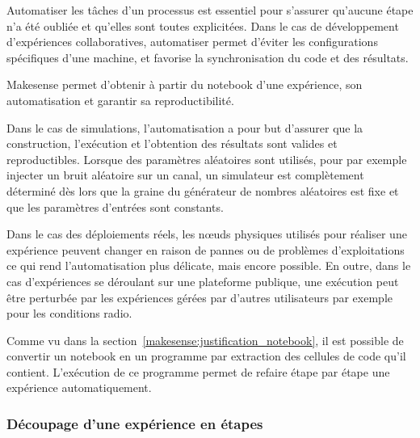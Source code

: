 Automatiser les tâches d'un processus est essentiel pour s'assurer qu'aucune étape n'a été oubliée et qu'elles sont toutes explicitées. 
Dans le cas de développement d'expériences collaboratives, automatiser permet d'éviter les configurations spécifiques d'une machine, et favorise la synchronisation du code et des résultats.

Makesense permet d'obtenir à partir du notebook d'une expérience, son automatisation et garantir sa reproductibilité.

Dans le cas de simulations, l'automatisation a pour but d'assurer que la construction, l’exécution et l'obtention des résultats sont valides et reproductibles.
Lorsque des paramètres aléatoires sont utilisés, pour par exemple injecter un bruit aléatoire sur un canal, un simulateur est complètement déterminé dès lors que la graine du générateur de nombres aléatoires est fixe et que les paramètres d'entrées sont constants.

Dans le cas des déploiements réels, les nœuds physiques utilisés pour réaliser une expérience peuvent changer en raison de pannes ou de problèmes d'exploitations ce qui rend l'automatisation plus délicate, mais encore possible.
En outre, dans le cas d'expériences se déroulant sur une plateforme publique, une exécution peut être perturbée par les expériences gérées par d'autres utilisateurs par exemple pour les conditions radio.

Comme vu dans la section~\ref{makesense:justification_notebook}, il est possible de convertir un notebook en un programme par extraction des cellules de code qu'il contient. 
L'exécution de ce programme permet de refaire étape par étape une expérience automatiquement.

\subsubsection{Découpage d'une expérience en étapes}

